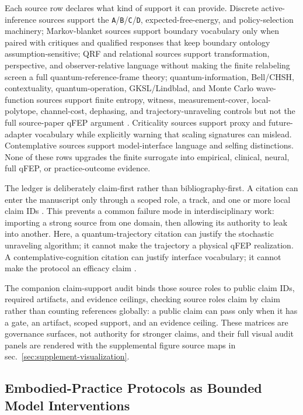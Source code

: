 \documentclass[
]{article}
\begin{document}
Each source row declares what kind of support it can provide. Discrete
active-inference sources support the
\texttt{A}/\texttt{B}/\texttt{C}/\texttt{D}, expected-free-energy, and
policy-selection machinery; Markov-blanket sources support boundary
vocabulary only when paired with critiques and qualified responses that
keep boundary ontology assumption-sensitive; QRF and relational sources
support transformation, perspective, and observer-relative language
without making the finite relabeling screen a full
quantum-reference-frame theory; quantum-information, Bell/CHSH,
contextuality, quantum-operation, GKSL/Lindblad, and Monte Carlo
wave-function sources support finite entropy, witness,
measurement-cover, local-polytope, channel-cost, dephasing, and
trajectory-unraveling controls but not the full source-paper qFEP
argument \citep{spekkens2016quasi}. Criticality sources support proxy
and future-adapter vocabulary while explicitly warning that scaling
signatures can mislead. Contemplative sources support model-interface
language and selfing distinctions. None of these rows upgrades the
finite surrogate into empirical, clinical, neural, full qFEP, or
practice-outcome evidence.

The ledger is deliberately claim-first rather than bibliography-first. A
citation can enter the manuscript only through a scoped role, a track,
and one or more local claim IDs \citep{munafo2017manifesto}. This
prevents a common failure mode in interdisciplinary work: importing a
strong source from one domain, then allowing its authority to leak into
another. Here, a quantum-trajectory citation can justify the stochastic
unraveling algorithm; it cannot make the trajectory a physical qFEP
realization. A contemplative-cognition citation can justify interface
vocabulary; it cannot make the protocol an efficacy claim
\citep{garfield1995fundamental}.

The companion claim-support audit binds those source roles to public
claim IDs, required artifacts, and evidence ceilings, checking source
roles claim by claim rather than counting references globally: a public
claim can pass only when it has a gate, an artifact, scoped support, and
an evidence ceiling. These matrices are governance surfaces, not
authority for stronger claims, and their full visual audit panels are
rendered with the supplemental figure source maps in
sec.~\ref{sec:supplement-visualization}.

\subsection{Embodied-Practice Protocols as Bounded Model
Interventions}\label{sec:supplement-bounded-practice-protocols}
\end{document}
